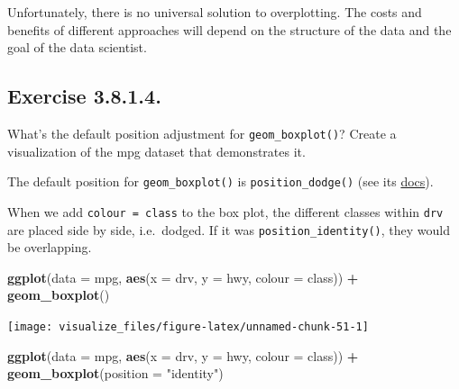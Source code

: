 \documentclass[]{book}
\newenvironment{Shaded}{\begin{snugshade}}{\end{snugshade}}
\newcommand{\DataTypeTok}[1]{\textcolor[rgb]{0.13,0.29,0.53}{#1}}
\newcommand{\KeywordTok}[1]{\textcolor[rgb]{0.13,0.29,0.53}{\textbf{#1}}}
\newcommand{\NormalTok}[1]{#1}
\newcommand{\OperatorTok}[1]{\textcolor[rgb]{0.81,0.36,0.00}{\textbf{#1}}}
\newcommand{\StringTok}[1]{\textcolor[rgb]{0.31,0.60,0.02}{#1}}
\theoremstyle{plain}
\theoremstyle{remark}
\begin{document}
Unfortunately, there is no universal solution to overplotting. The costs and
benefits of different approaches will depend on the structure of the data and the goal
of the data scientist.

\hypertarget{exercise-3.8.1.4.}{%
\subsection*{\texorpdfstring{Exercise {3.8.1.4}.}{Exercise 3.8.1.4.}}\label{exercise-3.8.1.4.}}

What's the default position adjustment for \texttt{geom\_boxplot()}? Create a visualization of the mpg dataset that demonstrates it.

The default position for \texttt{geom\_boxplot()} is \texttt{position\_dodge()} (see its \href{https://ggplot2.tidyverse.org/reference/geom_boxplot.html}{docs}).

When we add \texttt{colour\ =\ class} to the box plot, the different classes within \texttt{drv} are placed side by side, i.e.~dodged. If it was \texttt{position\_identity()}, they would be overlapping.

\begin{Shaded}
\begin{Highlighting}[]
\KeywordTok{ggplot}\NormalTok{(}\DataTypeTok{data =}\NormalTok{ mpg, }\KeywordTok{aes}\NormalTok{(}\DataTypeTok{x =}\NormalTok{ drv, }\DataTypeTok{y =}\NormalTok{ hwy, }\DataTypeTok{colour =}\NormalTok{ class)) }\OperatorTok{+}
\StringTok{  }\KeywordTok{geom_boxplot}\NormalTok{()}
\end{Highlighting}
\end{Shaded}

\begin{center}\texttt{[image: visualize\_files/figure-latex/unnamed-chunk-51-1]} \end{center}

\begin{Shaded}
\begin{Highlighting}[]
\KeywordTok{ggplot}\NormalTok{(}\DataTypeTok{data =}\NormalTok{ mpg, }\KeywordTok{aes}\NormalTok{(}\DataTypeTok{x =}\NormalTok{ drv, }\DataTypeTok{y =}\NormalTok{ hwy, }\DataTypeTok{colour =}\NormalTok{ class)) }\OperatorTok{+}
\StringTok{  }\KeywordTok{geom_boxplot}\NormalTok{(}\DataTypeTok{position =} \StringTok{"identity"}\NormalTok{)}
\end{Highlighting}
\end{Shaded}
\end{document}
